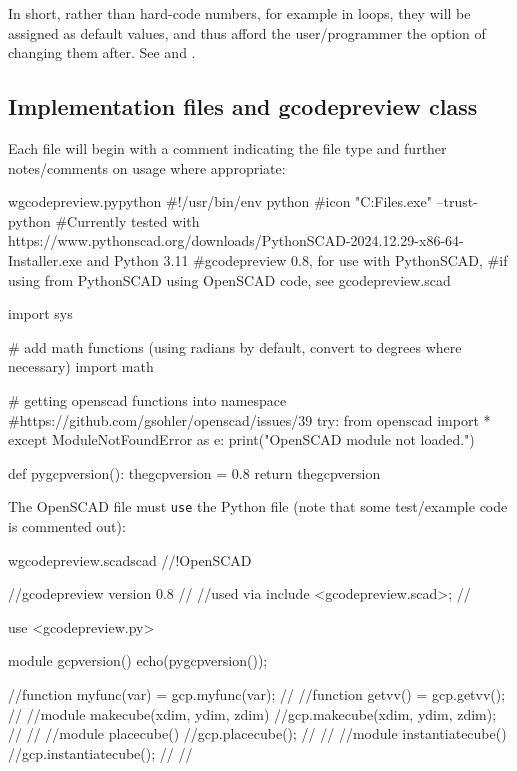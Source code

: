 \documentclass{ltxdoc}
\begin{document}
In short, rather than hard-code numbers, for example in loops, they will be assigned as default values, and thus afford the user/programmer the option of changing them after. See  and .

\subsection{Implementation files and gcodepreview class}
 
Each file will begin with a comment indicating the file type and further notes/comments on usage where appropriate:

\begin{writecode}{w}{gcodepreview.py}{python}
#!/usr/bin/env python
#icon "C:\Program Files\PythonSCAD\bin\openscad.exe" --trust-python
#Currently tested with https://www.pythonscad.org/downloads/PythonSCAD-2024.12.29-x86-64-Installer.exe and Python 3.11
#gcodepreview 0.8, for use with PythonSCAD, 
#if using from PythonSCAD using OpenSCAD code, see gcodepreview.scad

import sys

# add math functions (using radians by default, convert to degrees where necessary)
import math

# getting openscad functions into namespace
#https://github.com/gsohler/openscad/issues/39
try:
    from openscad import *
except ModuleNotFoundError as e:
    print("OpenSCAD module not loaded.")
    
def pygcpversion():
    thegcpversion = 0.8
    return thegcpversion

\end{writecode}
\addtocounter{gcpy}{22}

The OpenSCAD file must \verb|use| the Python file (note that some test/example code is commented out):

\begin{writecode}{w}{gcodepreview.scad}{scad}
//!OpenSCAD
 
//gcodepreview version 0.8
//
//used via include <gcodepreview.scad>;
//

use <gcodepreview.py>

module gcpversion(){
echo(pygcpversion());
}

//function myfunc(var) = gcp.myfunc(var);
//
//function getvv() = gcp.getvv();
//
//module makecube(xdim, ydim, zdim){
//gcp.makecube(xdim, ydim, zdim);
//}
//
//module placecube(){
//gcp.placecube();
//}
//
//module instantiatecube(){
//gcp.instantiatecube();
//}
//
\end{writecode}
\addtocounter{gcpscad}{30}
\end{document}
